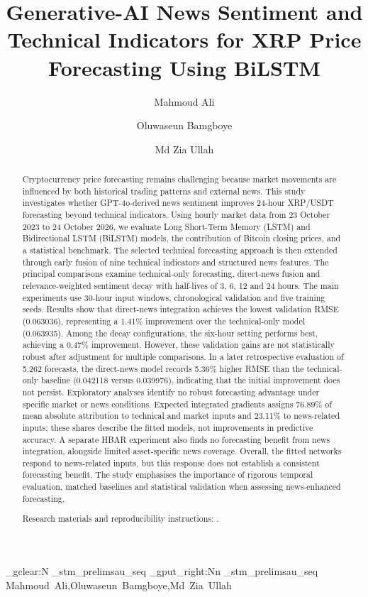 \let\WriteBookmarks\relax
{}
\title[mode=title]{Generative-AI News Sentiment and Technical Indicators for XRP Price Forecasting Using BiLSTM}
\author[1]{Mahmoud Ali}\cormark[1]
\author[1]{Oluwaseun Bamgboye}
\author[1]{Md Zia Ullah}
\ExplSyntaxOn
\seq_gclear:N \g_stm_prelimsau_seq
\seq_gput_right:Nn \g_stm_prelimsau_seq {Mahmoud~Ali,\enspace Oluwaseun~Bamgboye,\enspace Md~Zia~Ullah}
\ExplSyntaxOff
\begin{abstract}
Cryptocurrency price forecasting remains challenging because market movements are influenced by both historical trading patterns and external news. This study investigates whether GPT-4o-derived news sentiment improves 24-hour XRP/USDT forecasting beyond technical indicators. Using hourly market data from 23 October 2023 to 24 October 2026, we evaluate Long Short-Term Memory (LSTM) and Bidirectional LSTM (BiLSTM) models, the contribution of Bitcoin closing prices, and a statistical benchmark. The selected technical forecasting approach is then extended through early fusion of nine technical indicators and structured news features. The principal comparisons examine technical-only forecasting, direct-news fusion and relevance-weighted sentiment decay with half-lives of 3, 6, 12 and 24 hours. The main experiments use 30-hour input windows, chronological validation and five training seeds. Results show that direct-news integration achieves the lowest validation RMSE (0.063036), representing a 1.41\% improvement over the technical-only model (0.063935). Among the decay configurations, the six-hour setting performs best, achieving a 0.47\% improvement. However, these validation gains are not statistically robust after adjustment for multiple comparisons. In a later retrospective evaluation of 5,262 forecasts, the direct-news model records 5.36\% higher RMSE than the technical-only baseline (0.042118 versus 0.039976), indicating that the initial improvement does not persist. Exploratory analyses identify no robust forecasting advantage under specific market or news conditions. Expected integrated gradients assigns 76.89\% of mean absolute attribution to technical and market inputs and 23.11\% to news-related inputs; these shares describe the fitted models, not improvements in predictive accuracy. A separate HBAR experiment also finds no forecasting benefit from news integration, alongside limited asset-specific news coverage. Overall, the fitted networks respond to news-related inputs, but this response does not establish a consistent forecasting benefit. The study emphasises the importance of rigorous temporal evaluation, matched baselines and statistical validation when assessing news-enhanced forecasting.
\par\noindent Research materials and reproducibility instructions: \ResearchRepository.
\end{abstract}
